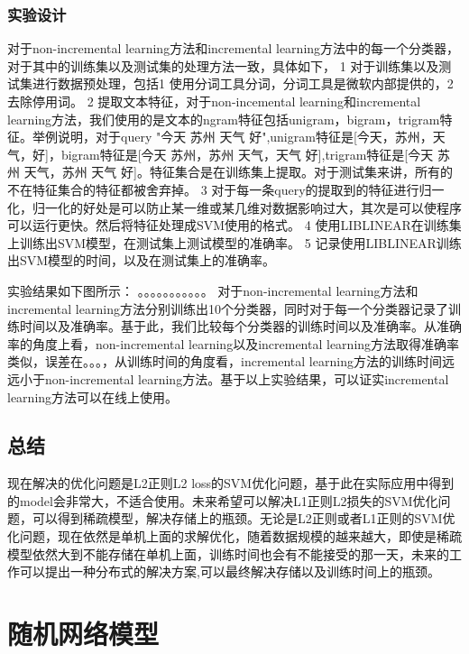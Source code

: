\documentclass[master]{njuthesis}
\begin{document}
\subsection{实验设计}

    对于non-incremental learning方法和incremental learning方法中的每一个分类器，对于其中的训练集以及测试集的处理方法一致，具体如下，
    1 对于训练集以及测试集进行数据预处理，包括1 使用分词工具分词，分词工具是微软内部提供的，2 去除停用词。
    2 提取文本特征，对于non-incemental learning和incremental learning方法，我们使用的是文本的ngram特征包括unigram，bigram，trigram特征。举例说明，对于query "今天 苏州 天气  好",unigram特征是[今天，苏州，天气，好]，bigram特征是[今天 苏州，苏州 天气，天气 好],trigram特征是[今天 苏州 天气，苏州 天气 好]。特征集合是在训练集上提取。对于测试集来讲，所有的不在特征集合的特征都被舍弃掉。
    3 对于每一条query的提取到的特征进行归一化，归一化的好处是可以防止某一维或某几维对数据影响过大，其次是可以使程序可以运行更快。然后将特征处理成SVM使用的格式。
    4 使用LIBLINEAR在训练集上训练出SVM模型，在测试集上测试模型的准确率。
    5 记录使用LIBLINEAR训练出SVM模型的时间，以及在测试集上的准确率。

    实验结果如下图所示：
    。。。。。。。。。。。
    对于non-incremental learning方法和incremental learning方法分别训练出10个分类器，同时对于每一个分类器记录了训练时间以及准确率。基于此，我们比较每个分类器的训练时间以及准确率。从准确率的角度上看，non-incremental learning以及incremental learning方法取得准确率类似，误差在。。。，从训练时间的角度看，incremental learning方法的训练时间远远小于non-incremental learning方法。基于以上实验结果，可以证实incremental learning方法可以在线上使用。

\section{总结}

    现在解决的优化问题是L2正则L2 loss的SVM优化问题，基于此在实际应用中得到的model会非常大，不适合使用。未来希望可以解决L1正则L2损失的SVM优化问题，可以得到稀疏模型，解决存储上的瓶颈。无论是L2正则或者L1正则的SVM优化问题，现在依然是单机上面的求解优化，随着数据规模的越来越大，即使是稀疏模型依然大到不能存储在单机上面，训练时间也会有不能接受的那一天，未来的工作可以提出一种分布式的解决方案,可以最终解决存储以及训练时间上的瓶颈。
\chapter{随机网络模型}\label{chapter_random}
\end{document}
